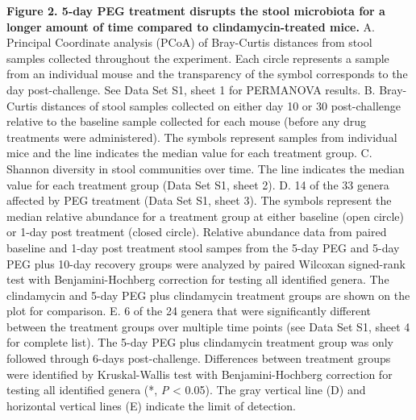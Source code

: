\documentclass[
  11pt,
]{article}
\begin{document}
\textbf{Figure 2. 5-day PEG treatment disrupts the stool microbiota for
a longer amount of time compared to clindamycin-treated mice.} A.
Principal Coordinate analysis (PCoA) of Bray-Curtis distances from stool
samples collected throughout the experiment. Each circle represents a
sample from an individual mouse and the transparency of the symbol
corresponds to the day post-challenge. See Data Set S1, sheet 1 for
PERMANOVA results. B. Bray-Curtis distances of stool samples collected
on either day 10 or 30 post-challenge relative to the baseline sample
collected for each mouse (before any drug treatments were administered).
The symbols represent samples from individual mice and the line
indicates the median value for each treatment group. C. Shannon
diversity in stool communities over time. The line indicates the median
value for each treatment group (Data Set S1, sheet 2). D. 14 of the 33
genera affected by PEG treatment (Data Set S1, sheet 3). The symbols
represent the median relative abundance for a treatment group at either
baseline (open circle) or 1-day post treatment (closed circle). Relative
abundance data from paired baseline and 1-day post treatment stool
sampes from the 5-day PEG and 5-day PEG plus 10-day recovery groups were
analyzed by paired Wilcoxan signed-rank test with Benjamini-Hochberg
correction for testing all identified genera. The clindamycin and 5-day
PEG plus clindamycin treatment groups are shown on the plot for
comparison. E. 6 of the 24 genera that were significantly different
between the treatment groups over multiple time points (see Data Set S1,
sheet 4 for complete list). The 5-day PEG plus clindamycin treatment
group was only followed through 6-days post-challenge. Differences
between treatment groups were identified by Kruskal-Wallis test with
Benjamini-Hochberg correction for testing all identified genera (*,
\emph{P} \textless{} 0.05). The gray vertical line (D) and horizontal
vertical lines (E) indicate the limit of detection. \newpage
\end{document}
